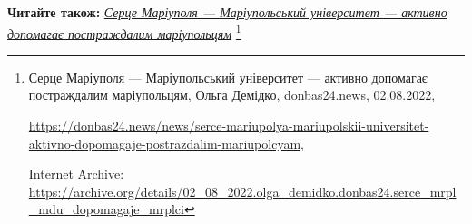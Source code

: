  
 
 
 
 

\textbf{Читайте також:} \href{https://archive.org/details/02_08_2022.olga_demidko.donbas24.serce_mrpl_mdu_dopomagaje_mrplci}{\emph{Серце Маріуполя — Маріупольський університет — активно допомагає постраждалим маріупольцям}}%
\footnote{Серце Маріуполя — Маріупольський університет — активно допомагає постраждалим маріупольцям, Ольга Демідко, donbas24.news, 02.08.2022, \par%
\url{https://donbas24.news/news/serce-mariupolya-mariupolskii-universitet-aktivno-dopomagaje-postrazdalim-mariupolcyam}, \par%
Internet Archive: \url{https://archive.org/details/02_08_2022.olga_demidko.donbas24.serce_mrpl_mdu_dopomagaje_mrplci}%
}
